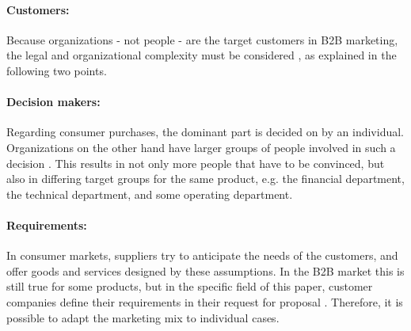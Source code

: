 \paragraph*{Customers:} 
Because organizations - not people - are the target customers in B2B marketing, the legal and organizational complexity must be considered \parencite[cf.][21]{Backhaus.2015b}, as explained in the following two points.

\paragraph*{Decision makers:} 
Regarding consumer purchases, the dominant part is decided on by an individual. Organizations on the other hand have larger groups of people involved in such a decision \parencite[cf.][21]{Backhaus.2015b}. This results in not only more people that have to be convinced, but also in differing target groups for the same product, e.g. the financial department, the technical department, and some operating department. 

\paragraph*{Requirements:} 
In consumer markets, suppliers try to anticipate the needs of the customers, and offer goods and services designed by these assumptions. In the B2B market this is still true for some products, but in the specific field of this paper, customer companies define their requirements in their request for proposal \parencite[cf.][22]{Backhaus.2015b}. Therefore, it is possible to adapt the marketing mix to individual cases.